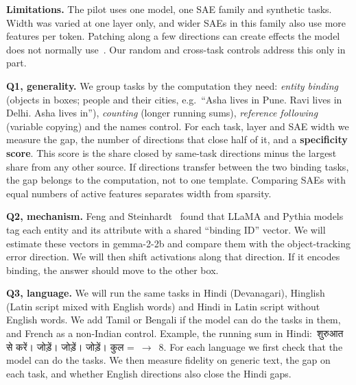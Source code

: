\documentclass[11pt,a4paper]{article}
\makeatletter
\newcommand{\hindi}[2]{{\devanagarifont #1}}%
\newcommand{\hindi}[2]{{\devanagarifont #1}}%
\newcommand{\hindi}[2]{\textit{#2}}%
\newcommand{\lat}[1]{{\normalfont #1}} %
\newcommand{\term}[1]{\textbf{#1}}
\renewcommand\section{\@startsection{section}{1}{\z@}{-1.6ex plus -.4ex}{0.6ex}{\large\bfseries\color{accent}}}
\makeatother
\begin{document}
\textbf{Limitations.} The pilot uses one model, one SAE family and synthetic tasks. Width was varied at one layer
only, and wider SAEs in this family also use more features per token. Patching along a few directions can create
effects the model does not normally use~\citep{makelov2024subspace}. Our random and cross-task controls address this
only in part.

\section{How: plan and success criteria}

\textbf{Q1, generality.} We group tasks by the computation they need: \emph{entity binding} (objects in boxes; people
and their cities, e.g.\ ``Asha lives in Pune. Ravi lives in Delhi. Asha lives in''), \emph{counting} (longer running
sums), \emph{reference following} (variable copying) and the names control. For each task, layer and SAE width we
measure the gap, the number of directions that close half of it, and a \term{specificity score}. This score is the
share closed by same-task directions minus the largest share from any other source. If directions transfer between the
two binding tasks, the gap belongs to the computation, not to one template. Comparing SAEs with equal numbers of
active features separates width from sparsity.

\textbf{Q2, mechanism.} Feng and Steinhardt~\citep{feng2024bind} found that LLaMA and Pythia models tag each entity and
its attribute with a shared ``binding ID'' vector. We will estimate these vectors in gemma-2-2b and compare them with
the object-tracking error direction. We will then shift activations along that direction. If it encodes binding, the
answer should move to the other box.

\textbf{Q3, language.} We will run the same tasks in Hindi (Devanagari), Hinglish (Latin script mixed with English
words) and Hindi in Latin script without English words. We add Tamil or Bengali if the model can do the tasks in them,
and French as a non-Indian control. Example, the running sum in Hindi:~\hindi{शुरुआत \lat{2} से करें। \lat{3} जोड़ें।
\lat{1} जोड़ें। \lat{2} जोड़ें। कुल \lat{=}}{shuruaat 2 se karen. 3 joden. 1 joden. 2 joden. kul =}~$\to$~8.
For each language we first check that the model can do the tasks. We then measure fidelity on generic text, the gap on
each task, and whether English directions also close the Hindi gaps.
\end{document}
